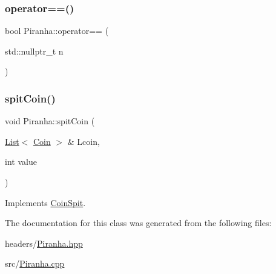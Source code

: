 \mbox{\label{class_piranha_a848b090631fa9bf1219ee1c925246125}} 
\subsubsection{\texorpdfstring{operator==()}{operator==()}\hspace{0.1cm}{\footnotesize\ttfamily [2/2]}}
{\footnotesize\ttfamily bool Piranha\+::operator== (\begin{DoxyParamCaption}\item[{std\+::nullptr\+\_\+t}]{n }\end{DoxyParamCaption})}

\mbox{\label{class_piranha_a4c1c29b2e68b4cb6eb2a295af74bf291}} 
\subsubsection{\texorpdfstring{spit\+Coin()}{spitCoin()}}
{\footnotesize\ttfamily void Piranha\+::spit\+Coin (\begin{DoxyParamCaption}\item[{\mbox{\hyperlink{class_list}{List}}$<$ \mbox{\hyperlink{class_coin}{Coin}} $>$ \&}]{Lcoin,  }\item[{int}]{value }\end{DoxyParamCaption})\hspace{0.3cm}{\ttfamily [virtual]}}



Implements \mbox{\hyperlink{class_coin_spit_a336f45a90c4b0b57017b45a5c68f12a7}{Coin\+Spit}}.



The documentation for this class was generated from the following files\+:\begin{DoxyCompactItemize}
\item 
headers/\mbox{\hyperlink{_piranha_8hpp}{Piranha.\+hpp}}\item 
src/\mbox{\hyperlink{_piranha_8cpp}{Piranha.\+cpp}}\end{DoxyCompactItemize}
